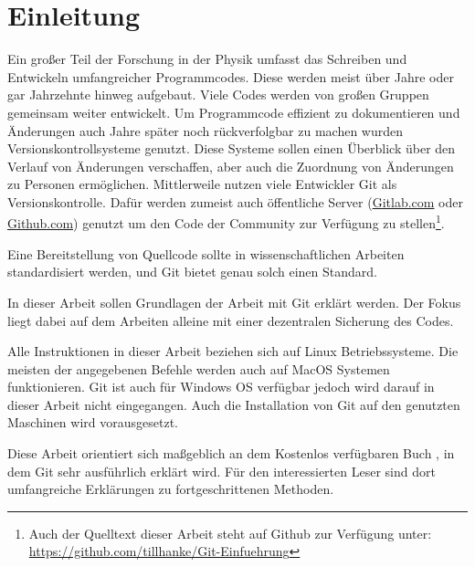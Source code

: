 \section{Einleitung}
Ein großer Teil der Forschung in der Physik umfasst das Schreiben und Entwickeln umfangreicher Programmcodes. Diese werden meist über Jahre oder gar Jahrzehnte hinweg aufgebaut. Viele Codes werden von großen Gruppen gemeinsam weiter entwickelt. Um Programmcode effizient zu dokumentieren und Änderungen auch Jahre später noch rückverfolgbar zu machen wurden Versionskontrollsysteme genutzt. Diese Systeme sollen einen Überblick über den Verlauf von Änderungen verschaffen, aber auch die Zuordnung von Änderungen zu Personen ermöglichen. Mittlerweile nutzen viele Entwickler Git als Versionskontrolle. Dafür werden zumeist auch öffentliche Server (\url{Gitlab.com} oder \url{Github.com}) genutzt um den Code der Community zur Verfügung zu stellen\footnote{Auch der Quelltext dieser Arbeit steht auf Github zur Verfügung unter: {\url{https://github.com/tillhanke/Git-Einfuehrung}}}. 

Eine Bereitstellung von Quellcode sollte in wissenschaftlichen Arbeiten standardisiert werden, und Git bietet genau solch einen Standard.

In dieser Arbeit sollen Grundlagen der Arbeit mit Git erklärt werden. Der Fokus liegt dabei auf dem Arbeiten alleine mit einer dezentralen Sicherung des Codes.

Alle Instruktionen in dieser Arbeit beziehen sich auf Linux Betriebssysteme. Die meisten der angegebenen Befehle werden auch auf MacOS Systemen funktionieren. Git ist auch für Windows OS verfügbar jedoch wird darauf in dieser Arbeit nicht eingegangen. Auch die Installation von Git auf den genutzten Maschinen wird vorausgesetzt.

Diese Arbeit orientiert sich maßgeblich an dem Kostenlos verfügbaren Buch \cite{ProGit}, in dem Git sehr ausführlich erklärt wird. Für den interessierten Leser sind dort umfangreiche Erklärungen zu fortgeschrittenen Methoden.


